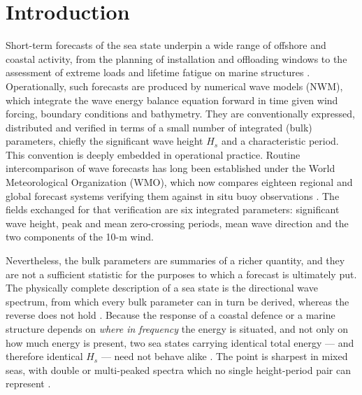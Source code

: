 \section{Introduction}
\label{sec:introduction}


Short-term forecasts of the sea state underpin a wide range of offshore and coastal activity,
from the planning of installation and offloading windows to the assessment of extreme loads and
lifetime fatigue on marine structures \citep{orimoloye2019bimodal}. Operationally, such forecasts
are produced by numerical wave models (NWM), which integrate the wave energy balance equation
forward in time given wind forcing, boundary conditions and bathymetry. They are conventionally
expressed, distributed and verified in terms of a small number of integrated (bulk) parameters, chiefly the significant wave height $H_s$ and a characteristic period. This convention is deeply
embedded in operational practice. Routine intercomparison of wave forecasts has long been
established under the World Meteorological Organization (WMO), which now compares eighteen regional and global forecast systems verifying them against in situ buoy observations
\citep{ecmwf2026lcwfvproject}. The fields exchanged for that verification are six integrated
parameters: significant wave height, peak and mean zero-crossing periods, mean wave direction and the two components of the 10-m wind.

Nevertheless, the bulk parameters are summaries of a richer quantity, and they are not a
sufficient statistic for the purposes to which a forecast is ultimately put. The physically
complete description of a sea state is the directional wave spectrum, from which every
bulk parameter can in turn be derived, whereas the reverse does not hold \citep{holthuijsen2007}.
Because the response of a coastal defence or a marine structure depends on \emph{where in
frequency} the energy is situated, and not only on how much energy is present, two sea states
carrying identical total energy --- and therefore identical $H_s$ --- need not behave alike \citet{orimoloye2019bimodal}. The point is sharpest in mixed seas, with double or multi-peaked spectra which no single height-period pair can represent \citep{portilla2009,violantecarvalho2002}.

